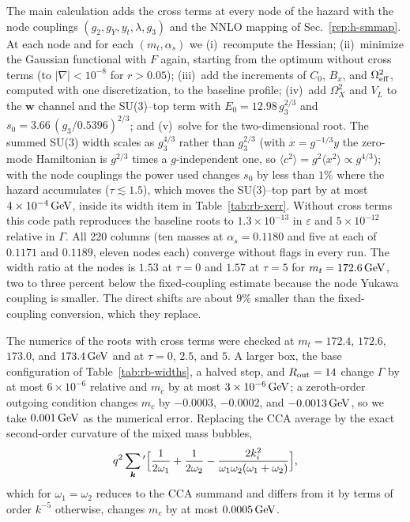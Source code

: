 The main calculation adds the cross terms at every node of the hazard with the node couplings $(g_2,g_Y,y_t,\lambda,g_3)$ and the NNLO mapping of Sec.~\ref{rep:h-smmap}.
At each node and for each $(m_t,\alpha_s)$ we
(i)~recompute the Hessian;
(ii)~minimize the Gaussian functional with $F$ again, starting from the optimum without cross terms (to $|\nabla|<10^{-8}$ for $r>0.05$);
(iii)~add the increments of $C_0$, $B_x$, and $\Omega_{\rm eff}^2$, computed with one discretization, to the baseline profile;
(iv)~add $\Omega_X^2$ and $V_L$ to the $\bm w$ channel and the SU(3)--top term with $E_0=12.98\,g_3^{2/3}$ and $s_0=3.66\,(g_3/0.5396)^{2/3}$; and
(v)~solve for the two-dimensional root. %
The summed SU(3) width scales as $g_3^{4/3}$ rather than $g_3^{2/3}$ (with $x=g^{-1/3}y$ the zero-mode Hamiltonian is $g^{2/3}$ times a $g$-independent one, so $\langle c^2\rangle=g^2\langle x^2\rangle\propto g^{4/3}$); with the node couplings the power used changes $s_0$ by less than $1\%$ where the hazard accumulates ($\tau\lesssim1.5$), which moves the SU(3)--top part by at most $4\times10^{-4}\,\mathrm{GeV}$, inside its width item in Table~\ref{tab:rb-xerr}. %
Without cross terms this code path reproduces the baseline roots to $1.3\times10^{-13}$ in $\varepsilon$ and $5\times10^{-12}$ relative in $\Gamma$. %
All 220 columns (ten masses at $\alpha_s=0.1180$ and five at each of $0.1171$ and $0.1189$, eleven nodes each) converge without flags in every run. %
The width ratio at the nodes is $1.53$ at $\tau=0$ and $1.57$ at $\tau=5$ for $m_t=172.6\,\mathrm{GeV}$, two to three percent below the fixed-coupling estimate because the node Yukawa coupling is smaller. %
The direct shifts are about $9\%$ smaller than the fixed-coupling conversion, which they replace. %

The numerics of the roots with cross terms were checked at $m_t=172.4$, $172.6$, $173.0$, and $173.4\,\mathrm{GeV}$ and at $\tau=0$, $2.5$, and $5$. %
A larger box, the base configuration of Table~\ref{tab:rb-widths}, a halved step, and $R_{\rm out}=14$ change $\Gamma$ by at most $6\times10^{-6}$ relative and $m_c$ by at most $3\times10^{-6}\,\mathrm{GeV}$; a zeroth-order outgoing condition changes $m_c$ by $-0.0003$, $-0.0002$, and $-0.0013\,\mathrm{GeV}$, so we take $0.001\,\mathrm{GeV}$ as the numerical error. %
Replacing the CCA average by the exact second-order curvature of the mixed mass bubbles,
\begin{equation}
q^2\sum_{\bm k}{}'\Bigl[\frac{1}{2\omega_1}+\frac{1}{2\omega_2}-\frac{2k_i^2}{\omega_1\omega_2(\omega_1+\omega_2)}\Bigr],
\label{eq:rb-mixedbubble}
\end{equation}
which for $\omega_1=\omega_2$ reduces to the CCA summand and differs from it by terms of order $k^{-5}$ otherwise, changes $m_c$ by at most $0.0005\,\mathrm{GeV}$. %

